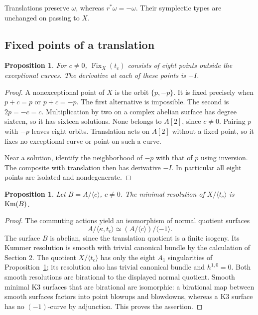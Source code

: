 \documentclass[11pt]{amsart}
\newtheorem{proposition}[theorem]{Proposition}
\theoremstyle{definition}
\newcommand{\Fix}{\operatorname{Fix}}\newcommand{\NS}{\operatorname{NS}}
\begin{document}
Translations preserve $\omega$, whereas $r^*\omega=-\omega$. Their
symplectic types are unchanged on passing to $X$.

\subsection{Fixed points of a translation}
\begin{proposition}\label{prop:translation}
For $c\ne0$, $\Fix_X(t_c)$ consists of eight points outside the
exceptional curves. The derivative at each of these points is $-I$.
\end{proposition}
\begin{proof}
A nonexceptional point of $X$ is the orbit $\{p,-p\}$. It is fixed
precisely when $p+c=p$ or $p+c=-p$. The first alternative is impossible.
The second is $2p=-c=c$. Multiplication by two on a complex abelian
surface has degree sixteen, so it has sixteen solutions. None belongs
to $A[2]$, since $c\ne0$. Pairing $p$ with $-p$ leaves eight orbits.
Translation acts on $A[2]$ without a fixed point, so it fixes no
exceptional curve or point on such a curve.

Near a solution, identify the neighborhood of $-p$ with that of $p$
using inversion. The composite with translation then has derivative
$-I$. In particular all eight points are isolated and nondegenerate.
\end{proof}

\begin{proposition}\label{prop:quotient}
Let $B=A/\langle c\rangle$, $c\ne0$. The minimal resolution of
$X/\langle t_c\rangle$ is $\operatorname{Km}(B)$.
\end{proposition}
\begin{proof}
The commuting actions yield an isomorphism of normal quotient surfaces
\[
 A/\langle\kappa,t_c\rangle
   \simeq (A/\langle c\rangle)/\langle-1\rangle.
\]
The surface $B$ is abelian, since the translation quotient is a finite
isogeny. Its Kummer resolution is smooth with trivial canonical bundle
by the calculation of Section 2. The quotient $X/\langle t_c\rangle$
has only the eight $A_1$ singularities of
Proposition~\ref{prop:translation}; its resolution also has trivial
canonical bundle and $h^{1,0}=0$. Both smooth resolutions are birational
to the displayed normal quotient. Smooth minimal K3 surfaces that are
birational are isomorphic: a birational map between smooth surfaces
factors into point blowups and blowdowns, whereas a K3 surface has no
$(-1)$-curve by adjunction. This proves the assertion.
\end{proof}
\end{document}
